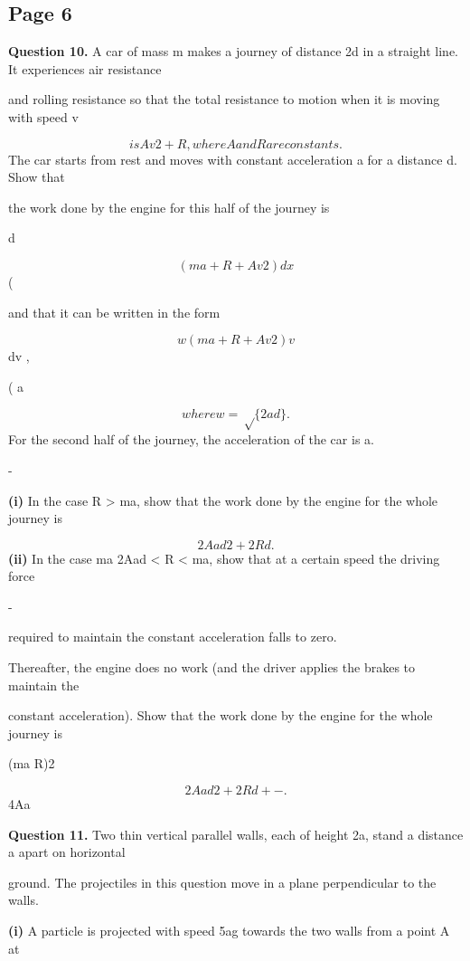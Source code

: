 \documentclass[12pt]{article}
\begin{document}
\subsection*{Page 6}
\begin{flushleft}
\bigskip\textbf{Question 10.} A car of mass m makes a journey of distance 2d in a straight line. It experiences air resistance\par
and rolling resistance so that the total resistance to motion when it is moving with speed v\par
\[is Av2 + R, where A and R are constants.\]
The car starts from rest and moves with constant acceleration a for a distance d. Show that\par
the work done by the engine for this half of the journey is\par
d\par
\[(ma + R + Av2) dx\]
(\par
and that it can be written in the form\par
\[w (ma + R + Av2)v\]
dv ,\par
( a\par
\[where w = \sqrt\{2ad\} .\]
For the second half of the journey, the acceleration of the car is a.\par
-\par
\textbf{(i)} In the case R > ma, show that the work done by the engine for the whole journey is\par
\[2Aad2 + 2Rd .\]
\textbf{(ii)} In the case ma 2Aad < R < ma, show that at a certain speed the driving force\par
-\par
required to maintain the constant acceleration falls to zero.\par
Thereafter, the engine does no work (and the driver applies the brakes to maintain the\par
constant acceleration). Show that the work done by the engine for the whole journey is\par
(ma R)2\par
\[2Aad2 + 2Rd + - .\]
4Aa\par
\bigskip\textbf{Question 11.} Two thin vertical parallel walls, each of height 2a, stand a distance a apart on horizontal\par
ground. The projectiles in this question move in a plane perpendicular to the walls.\par
\textbf{(i)} A particle is projected with speed \sqrt5ag towards the two walls from a point A at\par

\end{flushleft}
\end{document}
